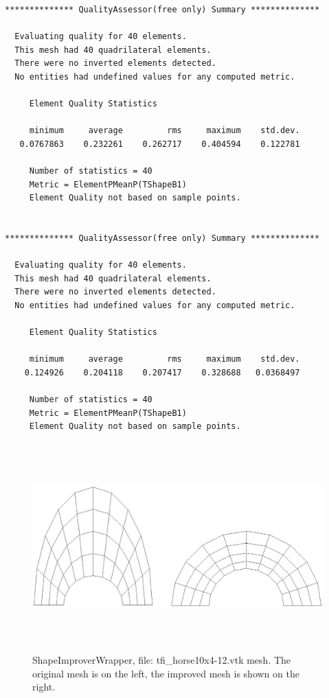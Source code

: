 \begin{verbatim}
************** QualityAssessor(free only) Summary **************

  Evaluating quality for 40 elements.
  This mesh had 40 quadrilateral elements.
  There were no inverted elements detected.
  No entities had undefined values for any computed metric.

     Element Quality Statistics

     minimum     average         rms     maximum    std.dev.
   0.0767863    0.232261    0.262717    0.404594    0.122781

     Number of statistics = 40
     Metric = ElementPMeanP(TShapeB1)
     Element Quality not based on sample points.


************** QualityAssessor(free only) Summary **************

  Evaluating quality for 40 elements.
  This mesh had 40 quadrilateral elements.
  There were no inverted elements detected.
  No entities had undefined values for any computed metric.

     Element Quality Statistics

     minimum     average         rms     maximum    std.dev.
    0.124926    0.204118    0.207417    0.328688   0.0368497

     Number of statistics = 40
     Metric = ElementPMeanP(TShapeB1)
     Element Quality not based on sample points.
\end{verbatim}

\begin{figure}[htbp]
\begin{center}
    \includegraphics[height=80mm]{horseshoe-10x4.eps}
    \caption{ShapeImproverWrapper, file: tfi\_horse10x4-12.vtk mesh. The original mesh is on the left, the improved mesh is shown on the right.}
    \label{fig:inverted-hole-1}
\end{center}
\end{figure}


